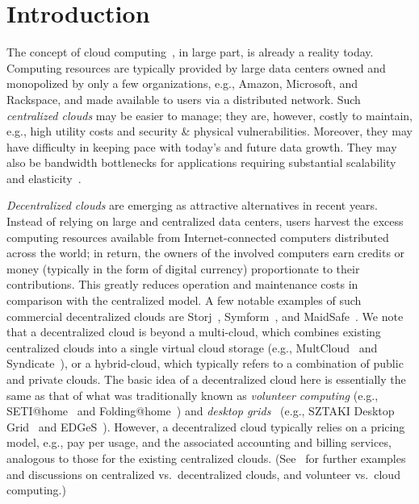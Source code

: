 \section{Introduction} \label{sect:intro}

The concept of cloud computing~\cite{AFG+10}, in large part, is already a reality today.
Computing resources are typically provided by large data centers owned and monopolized by only a few organizations, e.g., Amazon, Microsoft, and Rackspace, and made available to users via a distributed network.
Such {\em centralized clouds} may be easier to manage; they are, however, costly to maintain, e.g., high utility costs and security \& physical vulnerabilities.
Moreover, they may have difficulty in keeping pace with today's and future data growth.
They may also be bandwidth bottlenecks for applications requiring substantial scalability and elasticity~\cite{symform-slide,techrepublic}.

{\em Decentralized clouds} are emerging as attractive alternatives in recent years.
Instead of relying on large and centralized data centers, users harvest the excess computing resources available from Internet-connected computers distributed across the world; in return, the owners of the involved computers earn credits or money (typically in the form of digital currency) proportionate to their contributions.
This greatly reduces operation and maintenance costs in comparison with the centralized model.
A few notable examples of such commercial decentralized clouds are Storj~\cite{Storj}, Symform~\cite{Symform}, and MaidSafe~\cite{MaidSafe}.
We note that a decentralized cloud is beyond a multi-cloud, which combines existing centralized clouds into a single virtual cloud storage (e.g., MultCloud~\cite{MultCloud} and Syndicate~\cite{Syndicate}), or a hybrid-cloud, which typically refers to a combination of public and private clouds.
The basic idea of a decentralized cloud here is essentially the same as that of what was traditionally known as {\em volunteer computing} (e.g., SETI@home~\cite{Seti@home} and Folding@home~\cite{Folding@home}) and {\em desktop grids}~\cite{CKB+07} (e.g., SZTAKI Desktop Grid~\cite{sztaki} and EDGeS~\cite{edges}).
However, a decentralized cloud typically relies on a pricing model, e.g., pay per usage, and the associated accounting and billing services, analogous to those for the existing centralized clouds.
(See~\cite{DP12,CWH13,MKK13} for further examples and discussions on centralized vs.\ decentralized clouds, and volunteer vs.\ cloud computing.)

